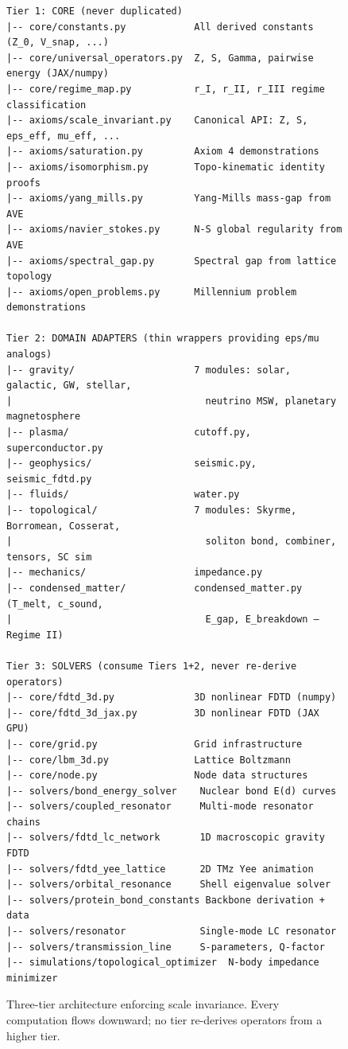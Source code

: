 \begin{figure}[H]
\centering
\begin{verbatim}
Tier 1: CORE (never duplicated)
|-- core/constants.py            All derived constants (Z_0, V_snap, ...)
|-- core/universal_operators.py  Z, S, Gamma, pairwise energy (JAX/numpy)
|-- core/regime_map.py           r_I, r_II, r_III regime classification
|-- axioms/scale_invariant.py    Canonical API: Z, S, eps_eff, mu_eff, ...
|-- axioms/saturation.py         Axiom 4 demonstrations
|-- axioms/isomorphism.py        Topo-kinematic identity proofs
|-- axioms/yang_mills.py         Yang-Mills mass-gap from AVE
|-- axioms/navier_stokes.py      N-S global regularity from AVE
|-- axioms/spectral_gap.py       Spectral gap from lattice topology
|-- axioms/open_problems.py      Millennium problem demonstrations

Tier 2: DOMAIN ADAPTERS (thin wrappers providing eps/mu analogs)
|-- gravity/                     7 modules: solar, galactic, GW, stellar,
|                                  neutrino MSW, planetary magnetosphere
|-- plasma/                      cutoff.py, superconductor.py
|-- geophysics/                  seismic.py, seismic_fdtd.py
|-- fluids/                      water.py
|-- topological/                 7 modules: Skyrme, Borromean, Cosserat,
|                                  soliton bond, combiner, tensors, SC sim
|-- mechanics/                   impedance.py
|-- condensed_matter/            condensed_matter.py (T_melt, c_sound,
|                                  E_gap, E_breakdown — Regime II)

Tier 3: SOLVERS (consume Tiers 1+2, never re-derive operators)
|-- core/fdtd_3d.py              3D nonlinear FDTD (numpy)
|-- core/fdtd_3d_jax.py          3D nonlinear FDTD (JAX GPU)
|-- core/grid.py                 Grid infrastructure
|-- core/lbm_3d.py               Lattice Boltzmann
|-- core/node.py                 Node data structures
|-- solvers/bond_energy_solver    Nuclear bond E(d) curves
|-- solvers/coupled_resonator     Multi-mode resonator chains
|-- solvers/fdtd_lc_network       1D macroscopic gravity FDTD
|-- solvers/fdtd_yee_lattice      2D TMz Yee animation
|-- solvers/orbital_resonance     Shell eigenvalue solver
|-- solvers/protein_bond_constants Backbone derivation + data
|-- solvers/resonator             Single-mode LC resonator
|-- solvers/transmission_line     S-parameters, Q-factor
|-- simulations/topological_optimizer  N-body impedance minimizer
\end{verbatim}
\caption{Three-tier architecture enforcing scale invariance.
Every computation flows downward; no tier re-derives operators
from a higher tier.}
\label{fig:engine_tiers}
\end{figure}


